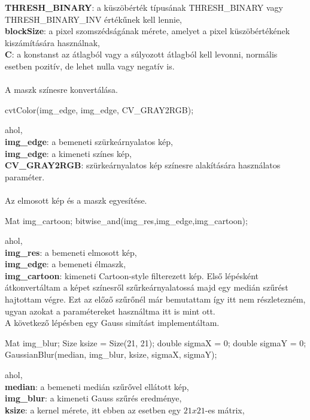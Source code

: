 \indent \textbf{THRESH\_BINARY}: a küszöbérték típusának THRESH\_BINARY vagy THRESH\_BINARY\_INV értékűnek kell lennie,\\
\indent \textbf{blockSize}: a pixel szomszédságának mérete, amelyet a pixel küszöbértékének kiszámítására használnak,\\
\indent \textbf{C}: a konstanst az átlagból vagy a súlyozott átlagból kell levonni, normális esetben pozitív, de lehet nulla vagy negatív is.\\\\
A maszk színesre konvertálása.
\begin{cpp}
cvtColor(img_edge, img_edge, CV_GRAY2RGB);
\end{cpp}
ahol, \\
\indent \textbf{img\_edge}: a bemeneti szürkeárnyalatos kép,\\
\indent \textbf{img\_edge}: a kimeneti színes kép,\\
\indent \textbf{CV\_GRAY2RGB}: szürkeárnyalatos kép színesre alakítására használatos paraméter.\\ \\
Az elmosott kép és a maszk egyesítése. 
\begin{cpp}
Mat img_cartoon;
bitwise_and(img_res,img_edge,img_cartoon);
\end{cpp}
ahol, \\
\indent \textbf{img\_res}: a bemeneti elmosott kép,\\
\indent \textbf{img\_edge}: a bemeneti élmaszk,\\
\indent \textbf{img\_cartoon}: kimeneti Cartoon-style filterezett kép.
Első lépésként átkonvertáltam a képet színesről szűrkeárnyalatossá majd egy medián szűrést hajtottam végre. Ezt az előző szűrőnél már bemutattam így itt nem részletezném, ugyan azokat a paramétereket használtma itt is mint ott.\\
A következő lépésben egy Gauss simítást implementáltam. 
\begin{cpp}
Mat img_blur;
Size ksize = Size(21, 21);
double sigmaX = 0;
double sigmaY = 0;
GaussianBlur(median, img_blur, ksize, sigmaX, sigmaY);
\end{cpp}
ahol, \\
\indent \textbf{median}: a bemeneti medián szűrővel ellátott kép,\\
\indent \textbf{img\_blur}: a kimeneti Gauss szűrés eredménye,\\
\indent \textbf{ksize}: a kernel mérete, itt ebben az esetben egy $21 x 21$-es mátrix,\\
